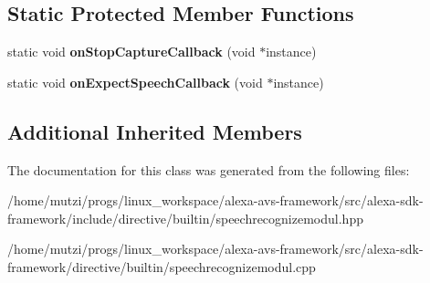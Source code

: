 \subsection*{Static Protected Member Functions}
\begin{DoxyCompactItemize}
\item 
\mbox{\label{classdirective_1_1SpeechRecognizeModul_a50aa87204a137eb92a9dc30f1b30baee}} 
static void {\bfseries on\+Stop\+Capture\+Callback} (void $\ast$instance)
\item 
\mbox{\label{classdirective_1_1SpeechRecognizeModul_a476ec6e33174929c6954c40b2eb63542}} 
static void {\bfseries on\+Expect\+Speech\+Callback} (void $\ast$instance)
\end{DoxyCompactItemize}
\subsection*{Additional Inherited Members}


The documentation for this class was generated from the following files\+:\begin{DoxyCompactItemize}
\item 
/home/mutzi/progs/linux\+\_\+workspace/alexa-\/avs-\/framework/src/alexa-\/sdk-\/framework/include/directive/builtin/speechrecognizemodul.\+hpp\item 
/home/mutzi/progs/linux\+\_\+workspace/alexa-\/avs-\/framework/src/alexa-\/sdk-\/framework/directive/builtin/speechrecognizemodul.\+cpp\end{DoxyCompactItemize}
